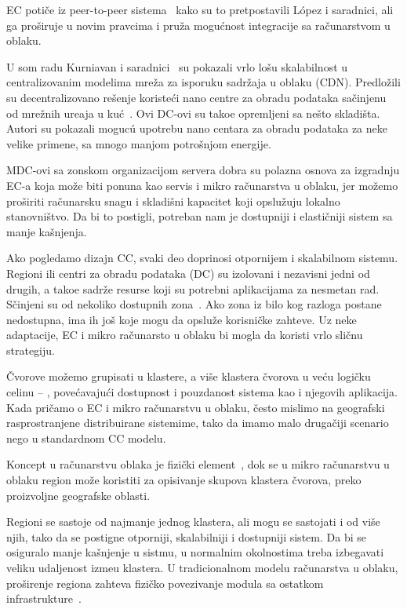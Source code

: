 EC poti\v ce iz peer-to-peer sistema~\cite{LopezMEDHIBFR15} kako su to pretpostavili L{\'{o}}pez i saradnici, ali ga pro\v siruje u novim pravcima i pru\v za mogu\'cnost integracije sa ra\v cunarstvom u oblaku.

U som radu Kurniavan i saradnici~\cite {inbookKurniawan} su pokazali vrlo lo\v su skalabilnost u centralizovanim modelima mre\v za za isporuku sadr\v zaja u oblaku (CDN). Predlo\v zili su decentralizovano re\v senje koriste\'ci nano centre za obradu podataka sa\v cinjenu od mrežnih ure\dj aja u ku\'c~\cite{inbookKurniawan}. Ovi DC-ovi su tako\dj e opremljeni sa ne\v sto skladi\v sta. Autori su pokazali moguc\'u upotrebu nano centara za obradu podataka za neke velike primene, sa mnogo manjom potro\v snjom energije.

MDC-ovi sa zonskom organizacijom servera dobra su polazna osnova za izgradnju EC-a koja mo\v ze biti ponu\dj na kao servis i mikro ra\v cunarstva u oblaku, jer možemo pro\v siriti ra\v cunarsku snagu i skladi\v sni kapacitet koji opslu\v zuju lokalno stanovništvo. Da bi to postigli, potreban nam je dostupniji i elasti\v cniji sistem sa manje ka\v snjenja. 

Ako pogledamo dizajn CC, svaki deo doprinosi otpornijem i skalabilnom sistemu. Regioni ili centri za obradu podataka (DC) su izolovani i nezavisni jedni od drugih, a tako\dj e sadr\v ze resurse koji su potrebni aplikacijama za nesmetan rad. S\v cinjeni su od nekoliko dostupnih zona~\cite {SouzaMFAK19}. Ako zona iz bilo kog razloga postane nedostupna, ima ih jo\v s koje mogu da opslu\v ze korisni\v cke zahteve. Uz neke adaptacije, EC i mikro ra\v cunarsto u oblaku bi mogla da koristi vrlo sli\v cnu strategiju.

\v Cvorove mo\v zemo grupisati u klastere, a vi\v se klastera \v cvorova u ve\'cu logi\v cku celinu -- , povećavaju\'ci dostupnost i pouzdanost sistema kao i njegovih aplikacija. Kada pri\v camo o EC i mikro ra\v cunarstvu u oblaku, \v cesto mislimo na geografski rasprostranjene distribuirane sistemime, tako da imamo malo druga\v ciji scenario nego u standardnom CC modelu. 

Koncept  u ra\v cunarstvu oblaka je fizi\v cki element~\cite{SouzaMFAK19}, dok se u mikro ra\v cunarstvu u oblaku region mo\v ze koristiti za opisivanje skupova klastera \v cvorova, preko proizvoljne geografske oblasti. 

Regioni se sastoje od najmanje jednog klastera, ali mogu se sastojati i od vi\v se njih, tako da se postigne otporniji, skalabilniji i dostupniji sistem. Da bi se osiguralo manje ka\v snjenje u sistmu, u normalnim okolnostima treba izbegavati veliku udaljenost izme\dj u klastera. U tradicionalnom modelu ra\v cunarstva u oblaku, pro\v sirenje regiona zahteva fizi\v cko povezivanje modula sa ostatkom infrastrukture~\cite {Hamilton07}. 

